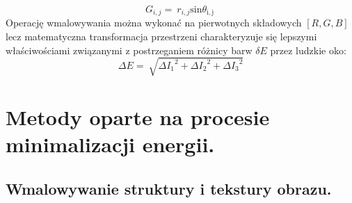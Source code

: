 \documentclass[12pt, twoside, openany]{report}
\theoremstyle{definition}
\begin{document}
\begin{equation}
G_{i,j}=\ r_{i,j}{\mathrm{sin} {\theta }_{\mathrm{i,j}}\ } 
\label{TInvIthree}
\end{equation}
Operację wmalowywania można wykonać na pierwotnych składowych $[R,G,B]$ lecz matematyczna transformacja przestrzeni charakteryzuje się lepszymi właściwościami związanymi z postrzeganiem różnicy barw $\delta E$ przez ludzkie oko:
\begin{equation}
\Delta E=\ \sqrt{{\Delta I_1}^2+{\Delta I_2}^2+{\Delta I_3}^2}
\label{deltaE}
\end{equation}
\chapter{Metody oparte na procesie minimalizacji energii.}
\section{Wmalowywanie struktury i tekstury obrazu.}\label{chap:StructureTextureNavierStokes}
\end{document}
